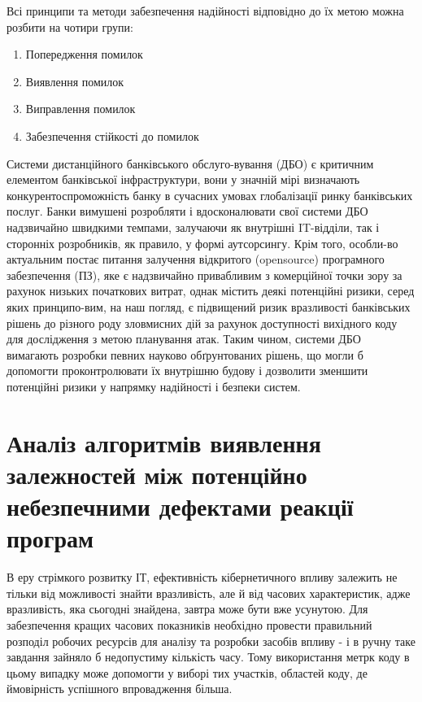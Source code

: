 Всі принципи та методи забезпечення надійності відповідно до їх метою можна розбити на чотири групи:
\begin{enumerate}
\item {} 
Попередження помилок

\item {} 
Виявлення помилок

\item {} 
Виправлення помилок

\item {} 
Забезпечення стійкості до помилок

\end{enumerate}

Системи дистанційного банківського обслуго-вування (ДБО) є критичним елементом банківської інфраструктури, вони у значній мірі визначають конкурентоспроможність банку в сучасних умовах глобалізації ринку банківських послуг. Банки вимушені розробляти і вдосконалювати свої системи ДБО надзвичайно швидкими темпами, залучаючи як внутрішні IT-відділи, так і сторонніх розробників, як правило, у формі аутсорсингу. Крім того, особли-во актуальним постає питання залучення відкритого (opensource) програмного забезпечення (ПЗ), яке є надзвичайно привабливим з комерційної точки зору за рахунок низьких початкових витрат, однак містить деякі потенційні ризики, серед яких принципо-вим, на наш погляд, є підвищений ризик вразливості банківських рішень до різного роду зловмисних дій за рахунок доступності вихідного коду для дослідження з метою планування атак. Таким чином, системи ДБО вимагають розробки певних науково обґрунтованих рішень, що могли б допомогти проконтролювати їх внутрішню будову і дозволити зменшити потенційні ризики у напрямку надійності і безпеки систем.


\section{Аналіз алгоритмів виявлення залежностей між потенційно небезпечними дефектами реакції програм}
\label{2section:id8}
В еру стрімкого розвитку ІТ, ефективність кібернетичного впливу залежить не тільки від можливості знайти вразливість, але й від часових характеристик, адже вразливість, яка сьогодні знайдена, завтра може бути вже усунутою. Для забезпечення кращих часових показників необхідно провести правильний розподіл робочих ресурсів для аналізу та розробки засобів впливу - і в ручну таке завдання зайняло б недопустиму кількість часу. Тому використання метрк коду в цьому випадку може допомогти у виборі тих участків, областей коду, де ймовірність успішного впровадження більша.

